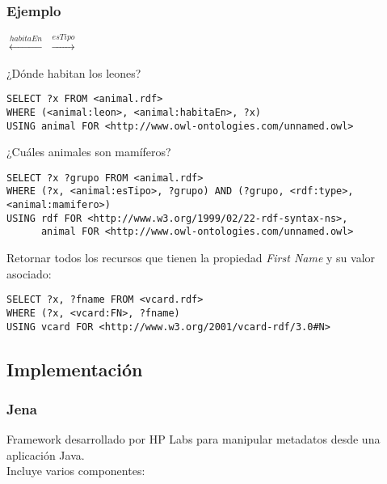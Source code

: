 \documentclass[a4paper,10pt,spanish,oneside]{article}
\begin{document}
\subsubsection{Ejemplo}

\begin{center}
 $\stackrel{habitaEn}{\leftarrow}$  $\stackrel{esTipo}{\rightarrow}$ 
\end{center}

¿Dónde habitan los leones?

\begin{lstlisting}
SELECT ?x FROM <animal.rdf>
WHERE (<animal:leon>, <animal:habitaEn>, ?x)
USING animal FOR <http://www.owl-ontologies.com/unnamed.owl>
\end{lstlisting}

¿Cuáles animales son mamíferos?

\begin{lstlisting}
SELECT ?x ?grupo FROM <animal.rdf>
WHERE (?x, <animal:esTipo>, ?grupo) AND (?grupo, <rdf:type>, <animal:mamifero>)
USING rdf FOR <http://www.w3.org/1999/02/22-rdf-syntax-ns>,
	  animal FOR <http://www.owl-ontologies.com/unnamed.owl>
\end{lstlisting}

\dotfill

Retornar todos los recursos que tienen la propiedad \textit{First Name} y su valor asociado:

\begin{lstlisting}
SELECT ?x, ?fname FROM <vcard.rdf>
WHERE (?x, <vcard:FN>, ?fname)
USING vcard FOR <http://www.w3.org/2001/vcard-rdf/3.0#N>
\end{lstlisting}

\subsection{Implementación}

\subsubsection{Jena}

Framework desarrollado por HP Labs para manipular metadatos desde una aplicación Java. \\

Incluye varios componentes:
\end{document}
